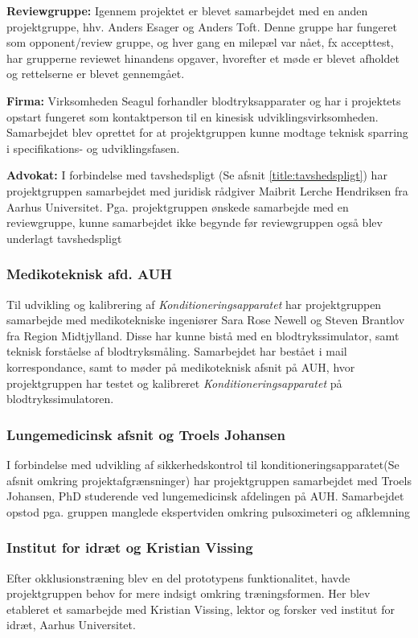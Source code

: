 \textbf{Reviewgruppe:} Igennem projektet er blevet samarbejdet med en anden projektgruppe, hhv. Anders Esager og Anders Toft. Denne gruppe har fungeret som opponent/review gruppe, og hver gang en milepæl var nået, fx accepttest, har grupperne reviewet hinandens opgaver, hvorefter et møde er blevet afholdet og rettelserne er blevet gennemgået.  

\textbf{Firma:} Virksomheden Seagul forhandler blodtryksapparater og har i projektets opstart fungeret som kontaktperson til en kinesisk udviklingsvirksomheden. Samarbejdet blev oprettet for at projektgruppen kunne modtage teknisk sparring i specifikations- og udviklingsfasen. 

\textbf{Advokat:} I forbindelse med tavshedspligt (Se afsnit \ref{title:tavshedspligt}) har projektgruppen samarbejdet med juridisk rådgiver Maibrit Lerche Hendriksen fra Aarhus Universitet. Pga. projektgruppen ønskede samarbejde med en reviewgruppe, kunne samarbejdet ikke begynde før reviewgruppen også blev underlagt tavshedspligt 

\subsubsection{Medikoteknisk afd. AUH}
Til udvikling og kalibrering af \textit{Konditioneringsapparatet} har projektgruppen samarbejde med medikotekniske ingeniører  Sara Rose Newell og Steven Brantlov fra Region Midtjylland. Disse har kunne bistå med en blodtrykssimulator, samt teknisk forståelse af blodtryksmåling. Samarbejdet har bestået i mail korrespondance, samt to møder på medikoteknisk afsnit på AUH, hvor projektgruppen har testet og kalibreret \textit{Konditioneringsapparatet} på blodtrykssimulatoren. 

\subsubsection{Lungemedicinsk afsnit og Troels Johansen}
I forbindelse med udvikling af sikkerhedskontrol til konditioneringsapparatet(Se afsnit  omkring projektafgrænsninger) har projektgruppen samarbejdet med Troels Johansen, PhD studerende ved lungemedicinsk afdelingen på AUH. Samarbejdet opstod pga. gruppen manglede ekspertviden omkring pulsoximeteri og afklemning 

\subsubsection{Institut for idræt og Kristian Vissing}
Efter okklusionstræning blev en del prototypens funktionalitet, havde projektgruppen behov for mere indsigt omkring træningsformen. Her blev etableret et samarbejde med Kristian Vissing, lektor og forsker ved institut for idræt, Aarhus Universitet.  

